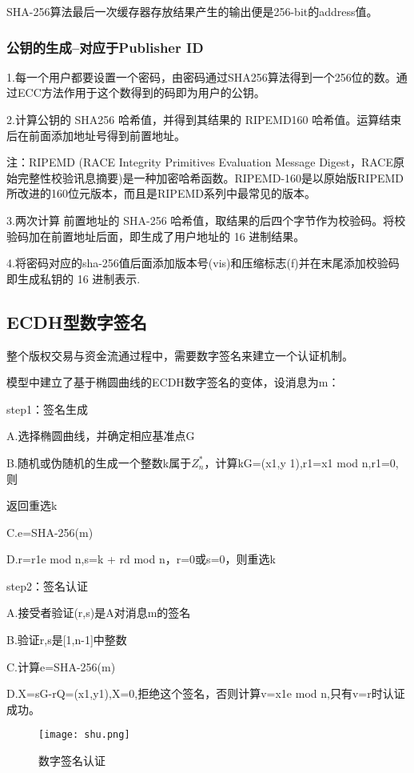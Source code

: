 \documentclass[withoutpreface,bwprint]{cumcmthesis} %
\begin{document}
SHA-256算法最后一次缓存器存放结果产生的输出便是256-bit的address值。\newline

\subsubsection{公钥的生成--对应于Publisher ID}

1.每一个用户都要设置一个密码，由密码通过SHA256算法得到一个256位的数。通过ECC方法作用于这个数得到的码即为用户的公钥。

2.计算公钥的 SHA256 哈希值，并得到其结果的 RIPEMD160 哈希值。运算结束后在前面添加地址号得到前置地址。

注：RIPEMD (RACE Integrity Primitives Evaluation Message Digest，RACE原始完整性校验讯息摘要)是一种加密哈希函数。RIPEMD-160是以原始版RIPEMD所改进的160位元版本，而且是RIPEMD系列中最常见的版本。


3.两次计算 前置地址的 SHA-256 哈希值，取结果的后四个字节作为校验码。将校验码加在前置地址后面，即生成了用户地址的 16 进制结果。

4.将密码对应的sha-256值后面添加版本号(vis)和压缩标志(f)并在末尾添加校验码即生成私钥的 16 进制表示. 

\subsection{ECDH型数字签名}

整个版权交易与资金流通过程中，需要数字签名来建立一个认证机制。

模型中建立了基于椭圆曲线的ECDH数字签名的变体，设消息为m：

step1：签名生成

A.选择椭圆曲线，并确定相应基准点G

B.随机或伪随机的生成一个整数k属于$Z_n^*$，计算kG=(x1,y
1),r1=x1 mod n,r1=0,则

返回重选k

C.e=SHA-256(m)

D.r=r1e mod n,s=k + rd mod n，r=0或s=0，则重选k

step2：签名认证

A.接受者验证(r,s)是A对消息m的签名

B.验证r,s是[1,n-1]中整数

C.计算e=SHA-256(m)

D.X=sG-rQ=(x1,y1),X=0,拒绝这个签名，否则计算v=x1e mod n,只有v=r时认证成功。

\begin{figure}[ht]
	\centering
	\texttt{[image: shu.png]}
	\caption{数字签名认证}
\end{figure}
\end{document}
